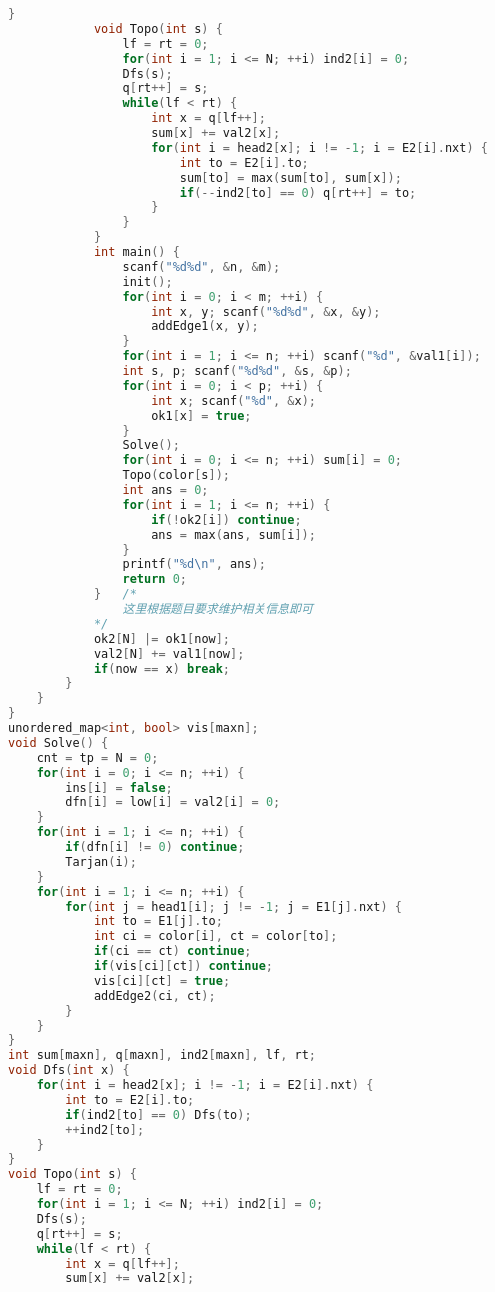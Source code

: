 \begin{lstlisting}[language=C++]
            }
            void Topo(int s) {
                lf = rt = 0;
                for(int i = 1; i <= N; ++i) ind2[i] = 0;
                Dfs(s);
                q[rt++] = s;
                while(lf < rt) {
                    int x = q[lf++];
                    sum[x] += val2[x];
                    for(int i = head2[x]; i != -1; i = E2[i].nxt) {
                        int to = E2[i].to;
                        sum[to] = max(sum[to], sum[x]);
                        if(--ind2[to] == 0) q[rt++] = to;
                    }
                }
            }
            int main() {
                scanf("%d%d", &n, &m);
                init();
                for(int i = 0; i < m; ++i) {
                    int x, y; scanf("%d%d", &x, &y);
                    addEdge1(x, y);
                }
                for(int i = 1; i <= n; ++i) scanf("%d", &val1[i]);
                int s, p; scanf("%d%d", &s, &p);
                for(int i = 0; i < p; ++i) {
                    int x; scanf("%d", &x);
                    ok1[x] = true;
                }
                Solve();
                for(int i = 0; i <= n; ++i) sum[i] = 0;
                Topo(color[s]);
                int ans = 0;
                for(int i = 1; i <= n; ++i) {
                    if(!ok2[i]) continue;
                    ans = max(ans, sum[i]);
                }
                printf("%d\n", ans);
                return 0;
            }   /*
                这里根据题目要求维护相关信息即可
            */
            ok2[N] |= ok1[now];
            val2[N] += val1[now];
            if(now == x) break;
        }
    }
}
unordered_map<int, bool> vis[maxn];
void Solve() {
    cnt = tp = N = 0;
    for(int i = 0; i <= n; ++i) {
        ins[i] = false;
        dfn[i] = low[i] = val2[i] = 0;
    }
    for(int i = 1; i <= n; ++i) {
        if(dfn[i] != 0) continue;
        Tarjan(i);
    }
    for(int i = 1; i <= n; ++i) {
        for(int j = head1[i]; j != -1; j = E1[j].nxt) {
            int to = E1[j].to;
            int ci = color[i], ct = color[to];
            if(ci == ct) continue;
            if(vis[ci][ct]) continue;
            vis[ci][ct] = true;
            addEdge2(ci, ct);
        }
    }
}
int sum[maxn], q[maxn], ind2[maxn], lf, rt;
void Dfs(int x) {
    for(int i = head2[x]; i != -1; i = E2[i].nxt) {
        int to = E2[i].to;
        if(ind2[to] == 0) Dfs(to);
        ++ind2[to];
    }
}
void Topo(int s) {
    lf = rt = 0;
    for(int i = 1; i <= N; ++i) ind2[i] = 0;
    Dfs(s);
    q[rt++] = s;
    while(lf < rt) {
        int x = q[lf++];
        sum[x] += val2[x];

\end{lstlisting}
